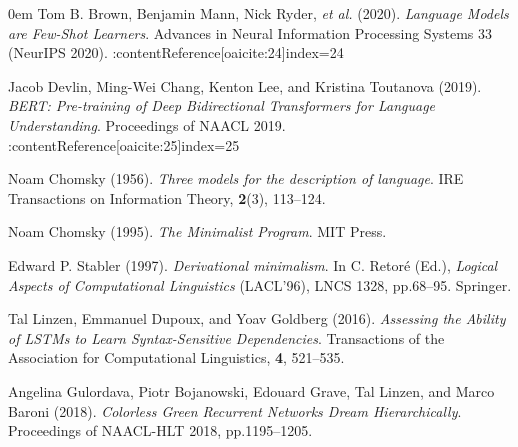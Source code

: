 \documentclass[11pt]{article}
\begin{document}
\begin{thebibliography}{99}\itemsep0em
 Tom B. Brown, Benjamin Mann, Nick Ryder, \emph{et al.} (2020). \textit{Language Models are Few-Shot Learners}. Advances in Neural Information Processing Systems 33 (NeurIPS 2020). :contentReference[oaicite:24]{index=24}

 Jacob Devlin, Ming-Wei Chang, Kenton Lee, and Kristina Toutanova (2019). \textit{BERT: Pre-training of Deep Bidirectional Transformers for Language Understanding}. Proceedings of NAACL 2019. :contentReference[oaicite:25]{index=25}

 Noam Chomsky (1956). \textit{Three models for the description of language}. IRE Transactions on Information Theory, \textbf{2}(3), 113–124.

 Noam Chomsky (1995). \textit{The Minimalist Program}. MIT Press.

 Edward P. Stabler (1997). \textit{Derivational minimalism}. In C. Retoré (Ed.), \textit{Logical Aspects of Computational Linguistics} (LACL'96), LNCS 1328, pp.68–95. Springer.

 Tal Linzen, Emmanuel Dupoux, and Yoav Goldberg (2016). \textit{Assessing the Ability of LSTMs to Learn Syntax-Sensitive Dependencies}. Transactions of the Association for Computational Linguistics, \textbf{4}, 521–535.

 Angelina Gulordava, Piotr Bojanowski, Edouard Grave, Tal Linzen, and Marco Baroni (2018). \textit{Colorless Green Recurrent Networks Dream Hierarchically}. Proceedings of NAACL-HLT 2018, pp.1195–1205.
\end{thebibliography}
\end{document}
